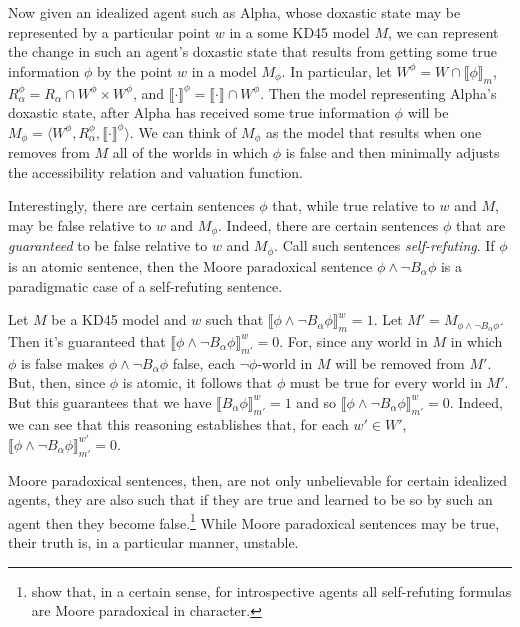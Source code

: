 Now given an idealized agent such as Alpha, whose doxastic state may be represented by a particular point $w$ in a some KD45 model $M$, we can represent the change in such an agent's doxastic state that results from getting some true information $\phi$ by the point $w$ in a model $M_\phi$.
In particular, let $W^\phi = W \cap \llbracket \phi \rrbracket_m$, $R_\alpha^\phi = R_\alpha \cap W^\phi \times W^\phi$, and $\llbracket \cdot \rrbracket^\phi = \llbracket \cdot \rrbracket \cap W^\phi$.
Then the model representing Alpha's doxastic state, after Alpha has received some true information $\phi$ will be $M_\phi = \langle W^\phi, R_\alpha^\phi, \llbracket \cdot \rrbracket^\phi \rangle$.
We can think of $M_\phi$ as the model that results when one removes from $M$ all of the worlds in which $\phi$ is false and then minimally adjusts the accessibility relation and valuation function.

Interestingly, there are certain sentences $\phi$ that, while true relative to $w$ and $M$, may be false relative to $w$ and $M_\phi$.
Indeed, there are certain sentences $\phi$ that are \textit{guaranteed} to be false relative to $w$ and $M_\phi$.
Call such sentences \textit{self-refuting}.
If $\phi$ is an atomic sentence, then the Moore paradoxical sentence $\phi \wedge \lnot B_\alpha \phi$ is a paradigmatic case of a self-refuting sentence.


Let $M$ be a KD45 model and $w$ such that $\llbracket \phi \wedge \lnot B_\alpha \phi \rrbracket^w_m = 1$.
Let $M' = M_{\phi \wedge \lnot B_\alpha \phi}$.
Then it's guaranteed that $\llbracket \phi \wedge \lnot B_\alpha \phi \rrbracket^w_{m'}= 0$.
For, since any world in $M$ in which $\phi$ is false makes $\phi \wedge \lnot B_\alpha \phi$ false, each $\lnot \phi$-world in $M$ will be removed from $M'$.
But, then, since $\phi$ is atomic, it follows that $\phi$ must be true for every world in $M'$.
But this guarantees that we have $\llbracket B_\alpha \phi \rrbracket^w_{m'} = 1$ and so $\llbracket \phi \wedge \lnot B_\alpha \phi \rrbracket^w_{m'}= 0$.
Indeed, we can see that this reasoning establishes that, for each $w' \in W'$,  $\llbracket \phi \wedge \lnot B_\alpha \phi \rrbracket^{w'}_{m'}= 0$. 

Moore paradoxical sentences, then, are not only unbelievable for certain idealized agents, they are also such that if they are true and learned to be so by such an agent then they become false.\footnote{\citet{HollidayIcard1} show that, in a certain sense, for introspective agents all self-refuting formulas are Moore paradoxical in character.}
While Moore paradoxical sentences may be true, their truth is, in a particular manner, unstable.

